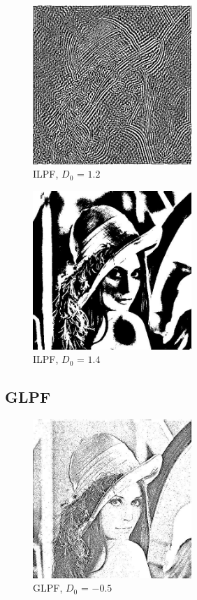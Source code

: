 \documentclass[conference]{IEEEtran}
\begin{document}
\begin{figure}[H]
\centerline{\includegraphics[width=6cm]{ILPF1_2.jpg}}
\caption{ILPF, $D_0$ = $1.2$}
\label{ILPF1.2}
\end{figure}

\begin{figure}[H]
\centerline{\includegraphics[width=6cm]{ILPF1_4.jpg}}
\caption{ILPF, $D_0$ = $1.4$}
\label{ILPF1.4}
\end{figure}

\subsection{GLPF}

\begin{figure}[H]
\centerline{\includegraphics[width=6cm]{GLPF-0_5.jpg}}
\caption{GLPF, $D_0$ = $-0.5$}
\label{GLPF-0.5}
\end{figure}
\end{document}
